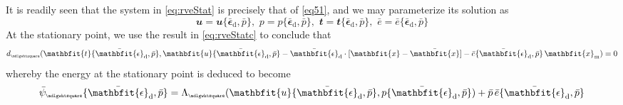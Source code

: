 \documentclass[12pt,a4paper]{article}
\renewcommand{\ta}[1]{\mathbfit{#1}}
\renewcommand{\ts}[1]{\mathbfit{#1}}
\renewcommand{\Box}{\mdlgwhtsquare}
\renewcommand{\dev}{\mathrm{d}}
\newcommand{\rve}{
  {\mathchoice
   {\mbox{\scalebox{0.67}{$\Box$}}}
   {\mbox{\scalebox{0.67}{$\Box$}}}
   {\mbox{\scalebox{0.5}{$\Box$}}}
   {\mbox{\scalebox{0.375}{$\Box$}}}
  }
}
\begin{document}
It is readily seen that the system in \cref{eq:rveStat} is precisely that of \cref{eq51}, and we may parameterize its solution as
\begin{equation}
    \ta{u}=\ta{u}\{\bar{\ts\epsilon}_\dev,\bar{p}\}, \,\,
    p=p\{\bar{\ts\epsilon}_\dev,\bar{p}\}, \,\,
    \ta{t}=\ta{t}\{\bar{\ts\epsilon}_\dev,\bar{p}\}, \,\,
    \bar{e}=\bar{e}\{\bar{\ts\epsilon}_\dev,\bar{p}\}
\label{eq85}
\end{equation}
At the stationary point, we use the result in \cref{eq:rveStatc} to conclude that
\begin{equation}
    d_\rve(\ta{t}\{\bar{\ts\epsilon}_\dev,\bar{p}\},\ta{u}\{\bar{\ts\epsilon}_\dev,\bar{p}\}-\bar{\ts\epsilon}_\dev\cdot[\ta{x}-\bar{\ta{x}}]-\bar{e}\{\bar{\ts\epsilon}_\dev,\bar{p}\}\,\ta{x}_\mean) = 0
\label{eq86}
\end{equation}
whereby the energy at the stationary point is deduced to become
\begin{equation}
    \bar{\psi}_\rve\{\bar{\ts\epsilon}_\dev,\bar{p}\} =
    \Lambda_\rve(\ta{u}\{\bar{\ts\epsilon}_\dev,\bar{p}\},p\{\bar{\ts\epsilon}_\dev,\bar{p}\}) + \bar{p}\,\bar{e}\{\bar{\ts\epsilon}_\dev,\bar{p}\}
\label{eq87}
\end{equation}
\end{document}
